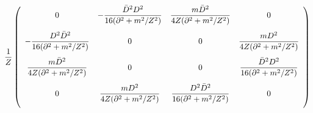 \begin{equation}
\frac{1}{Z}\left(
\begin{array}{cccc}
0 & {\displaystyle -\frac{\bar D^2 D^2}{16 (\partial^2 + m^2/Z^2)}} &
{\displaystyle \frac{m\bar D^2}{4 Z(\partial^2+m^2/Z^2)}
\vphantom{\int\limits_p}} & 0 \\
{\displaystyle - \frac{D^2\bar D^2}{16(\partial^2 + m^2/Z^2)}} & 0 & 0 &
{\displaystyle \frac{m D^2}{4Z(\partial^2+m^2/Z^2)}
\vphantom{\int\limits_p}} \\
{\displaystyle \frac{m\bar D^2}{4Z(\partial^2+m^2/Z^2)}
\vphantom{\int\limits_p}} & 0 & 0 &
{\displaystyle \frac{\bar D^2 D^2}{16 (\partial^2 + m^2/Z^2)}} \\
0 & {\displaystyle  \frac{m D^2}{4Z(\partial^2+m^2/Z^2)}
\vphantom{\int\limits_p}}
& {\displaystyle \frac{D^2\bar D^2}{16(\partial^2+m^2/Z^2)}} & 0
\end{array}
\right)
\end{equation}


